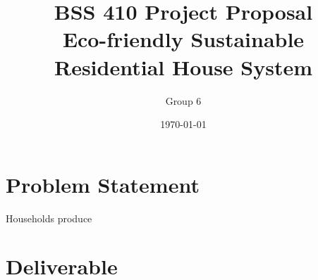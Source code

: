 \documentclass{article}
\begin{document}
\title{\vspace{-5em} BSS 410 Project Proposal\\Eco-friendly Sustainable Residential House System}
\author{Group 6}
\date{\today}
\maketitle

\section{Problem Statement}
Households produce

\section{Deliverable}
\end{document}
